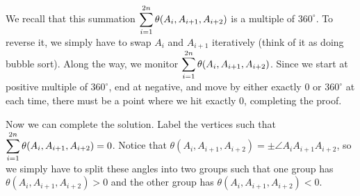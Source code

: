 \documentclass[11pt,a4paper]{article}
\begin{document}
\begin{enumerate}
	We recall that this summation $\displaystyle\sum_{i=1}^{2n}\theta(A_i, A_{i+1}, A_{i+2})$ is a multiple of $360^{\circ}$. To reverse it, we simply have to swap $A_i$ and $A_{i+1}$ iteratively (think of it as doing bubble sort). Along the way, we monitor $\displaystyle\sum_{i=1}^{2n}\theta(A_i, A_{i+1}, A_{i+2})$. Since we start at positive multiple of $360^{\circ}$, end at negative, and move by either exactly 0 or $360^{\circ}$ at each time, there must be a point where we hit exactly 0, completing the proof. 
	
	Now we can complete the solution. Label the vertices such that $\displaystyle\sum_{i=1}^{2n}\theta(A_i, A_{i+1}, A_{i+2})=0$. Notice that $\theta(A_i, A_{i+1}, A_{i+2})=\pm \angle A_iA_{i+1}A_{i+2}$, so we simply have to split these angles into two groups such that one group has $\theta(A_i, A_{i+1}, A_{i+2})>0$ and the other group has $\theta(A_i, A_{i+1}, A_{i+2})<0$. 
\end{enumerate}
\end{document}
